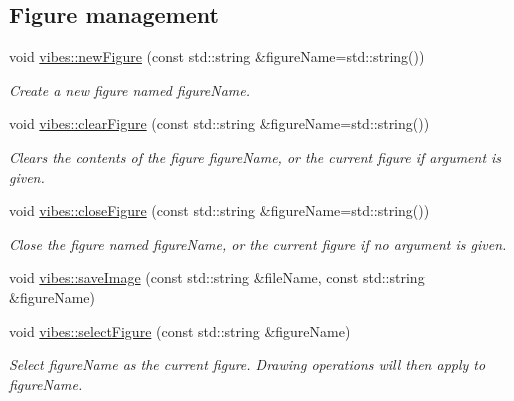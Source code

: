 \subsection*{Figure management}
\begin{DoxyCompactItemize}
\item 
\mbox{\label{group__figure_ga70a27a814768ac217e8323cb887f29a4}} 
void \hyperlink{group__figure_ga70a27a814768ac217e8323cb887f29a4}{vibes\+::new\+Figure} (const std\+::string \&figure\+Name=std\+::string())
\begin{DoxyCompactList}\small\item\em Create a new figure named {\itshape figure\+Name}. \end{DoxyCompactList}\item 
\mbox{\label{group__figure_ga4ff3b03be962d7ceba1062def0f557ef}} 
void \hyperlink{group__figure_ga4ff3b03be962d7ceba1062def0f557ef}{vibes\+::clear\+Figure} (const std\+::string \&figure\+Name=std\+::string())
\begin{DoxyCompactList}\small\item\em Clears the contents of the figure {\itshape figure\+Name}, or the current figure if argument is given. \end{DoxyCompactList}\item 
\mbox{\label{group__figure_gaa4bf32f16605010080edaea2437abb57}} 
void \hyperlink{group__figure_gaa4bf32f16605010080edaea2437abb57}{vibes\+::close\+Figure} (const std\+::string \&figure\+Name=std\+::string())
\begin{DoxyCompactList}\small\item\em Close the figure named {\itshape figure\+Name}, or the current figure if no argument is given. \end{DoxyCompactList}\item 
void \hyperlink{group__figure_gab6e221be3af71ea2286aecd0f7768908}{vibes\+::save\+Image} (const std\+::string \&file\+Name, const std\+::string \&figure\+Name)
\item 
\mbox{\label{group__figure_ga026c22d6f3ab562e6ddc2859da683170}} 
void \hyperlink{group__figure_ga026c22d6f3ab562e6ddc2859da683170}{vibes\+::select\+Figure} (const std\+::string \&figure\+Name)
\begin{DoxyCompactList}\small\item\em Select {\itshape figure\+Name} as the current figure. Drawing operations will then apply to {\itshape figure\+Name}. \end{DoxyCompactList}\end{DoxyCompactItemize}
